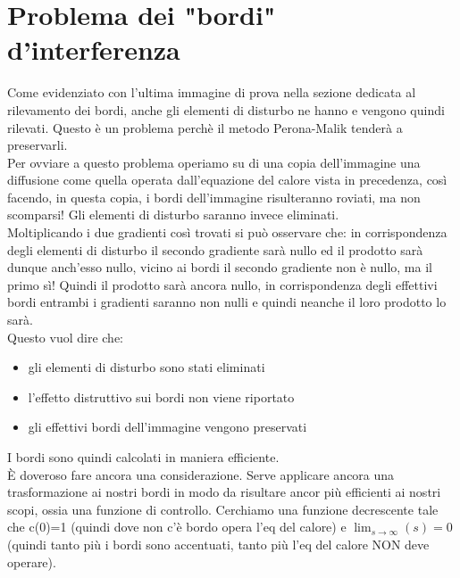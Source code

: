 \newpage 
\section{Problema dei "bordi" d'interferenza}
Come evidenziato con l'ultima immagine di prova nella sezione dedicata al rilevamento dei bordi, anche gli elementi di disturbo ne hanno e vengono quindi rilevati. Questo è un problema perchè il metodo Perona-Malik tenderà a preservarli.\\
Per ovviare a questo problema operiamo su di una copia dell'immagine una diffusione come quella operata dall'equazione del calore vista in precedenza, così facendo, in questa copia, i bordi dell'immagine risulteranno roviati, ma non scomparsi! Gli elementi di disturbo saranno invece eliminati.\\
Moltiplicando i due gradienti così trovati si può osservare che: in corrispondenza degli elementi di disturbo il secondo gradiente sarà nullo ed il prodotto sarà dunque anch'esso nullo, vicino ai bordi il secondo gradiente non è nullo, ma il primo sì! Quindi il prodotto sarà ancora nullo, in corrispondenza degli effettivi bordi entrambi i gradienti saranno non nulli e quindi neanche il loro prodotto lo sarà.\\ Questo vuol dire che:\\
\begin{itemize}
    \item gli elementi di disturbo sono stati eliminati
    \item l'effetto distruttivo sui bordi non viene riportato
    \item gli effettivi bordi dell'immagine vengono preservati
\end{itemize}
I bordi sono quindi calcolati in maniera efficiente.\\
\vspace{1em}
\`E doveroso fare ancora una considerazione. Serve applicare ancora una trasformazione ai nostri bordi in modo da risultare ancor più efficienti ai nostri scopi, ossia una funzione di controllo. Cerchiamo una funzione decrescente tale che c(0)=1 (quindi dove non c'è bordo opera l'eq del calore) e $\lim_{s\to\infty}(s)=0$ (quindi tanto più i bordi sono accentuati, tanto più l'eq del calore NON deve operare).
